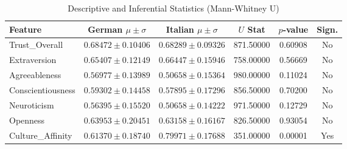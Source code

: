 \begin{table}
\caption{Descriptive and Inferential Statistics (Mann-Whitney U)}
\label{tab:significance_stats}
\begin{tabular}{lccccc}
\toprule
Feature & German $\mu \pm \sigma$ & Italian $\mu \pm \sigma$ & $U$ Stat & $p$-value & Sign. \\
\midrule
Trust_Overall & $0.68472 \pm 0.10406$ & $0.68289 \pm 0.09326$ & 871.50000 & 0.60908 & No \\
Extraversion & $0.65407 \pm 0.12149$ & $0.66447 \pm 0.15946$ & 758.00000 & 0.56669 & No \\
Agreeableness & $0.56977 \pm 0.13989$ & $0.50658 \pm 0.15364$ & 980.00000 & 0.11024 & No \\
Conscientiousness & $0.59302 \pm 0.14458$ & $0.57895 \pm 0.17296$ & 856.50000 & 0.70200 & No \\
Neuroticism & $0.56395 \pm 0.15520$ & $0.50658 \pm 0.14222$ & 971.50000 & 0.12729 & No \\
Openness & $0.63953 \pm 0.20451$ & $0.63158 \pm 0.16167$ & 826.50000 & 0.93054 & No \\
Culture_Affinity & $0.61370 \pm 0.18740$ & $0.79971 \pm 0.17688$ & 351.00000 & 0.00001 & Yes \\
\bottomrule
\end{tabular}
\end{table}
